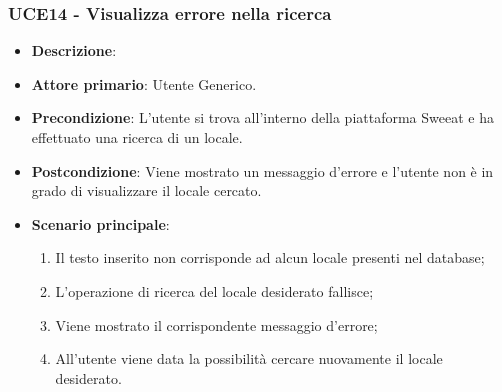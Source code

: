 \subsubsection{UCE14 - Visualizza errore nella ricerca}
\begin{itemize}
\item \textbf{Descrizione}:
\item \textbf{Attore primario}: Utente Generico.
\item \textbf{Precondizione}: L'utente si trova all’interno della piattaforma Sweeat e ha effettuato una ricerca di un locale.
\item \textbf{Postcondizione}: Viene mostrato un messaggio d'errore e l'utente non è in grado di visualizzare il locale cercato.
\item \textbf{Scenario principale}:
\begin{enumerate}    
	\item Il testo inserito non corrisponde ad alcun locale presenti nel database;
	\item L'operazione di ricerca del locale desiderato fallisce;
	\item Viene mostrato il corrispondente messaggio d'errore;
	\item All'utente viene data la possibilità cercare nuovamente il locale desiderato.
\end{enumerate}
\end{itemize}